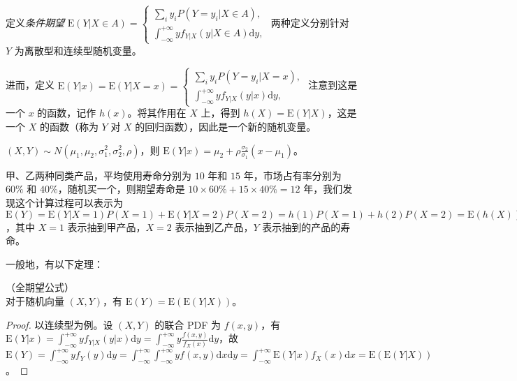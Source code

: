 \documentclass[../main.tex]{subfiles}
\begin{document}
定义\emph{条件期望} $\mathrm E(Y|X\in A)=\left\{
    \begin{aligned}
        \sum_iy_iP(Y=y_i|X\in A), \\
        \int_{-\infty}^{+\infty}yf_{Y|X}(y|X\in A)\mathrm dy,
    \end{aligned}\right.$ 两种定义分别针对 $Y$ 为离散型和连续型随机变量。

进而，定义 $\mathrm E(Y|x)=\mathrm E(Y|X=x)=\left\{
    \begin{aligned}
        \sum_iy_iP(Y=y_i|X=x), \\
        \int_{-\infty}^{+\infty}yf_{Y|X}(y|x)\mathrm dy,
    \end{aligned}\right.$ 注意到这是一个 $x$ 的函数，记作 $h(x)$。将其作用在 $X$ 上，得到 $h(X)=\mathrm E(Y|X)$，这是一个 $X$ 的函数（称为 $Y$ 对 $X$ 的回归函数），因此是一个新的随机变量。

\begin{example}
    $(X,Y)\sim N(\mu_1,\mu_2,\sigma_1^2,\sigma_2^2,\rho)$，则 $\mathrm E(Y|x)=\mu_2+\rho\frac{\sigma_2}{\sigma_1}(x-\mu_1)$。
\end{example}

\begin{example}
    甲、乙两种同类产品，平均使用寿命分别为 $10$ 年和 $15$ 年，市场占有率分别为 $60\%$ 和 $40\%$，随机买一个，则期望寿命是 $10\times 60\%+15\times 40\%=12$ 年，我们发现这个计算过程可以表示为 $\mathrm E(Y)=\mathrm E(Y|X=1)P(X=1)+\mathrm E(Y|X=2)P(X=2)=h(1)P(X=1)+h(2)P(X=2)=\mathrm E(h(X))=\mathrm E(\mathrm E(Y|X))$，其中 $X=1$ 表示抽到甲产品，$X=2$ 表示抽到乙产品，$Y$ 表示抽到的产品的寿命。
\end{example}

一般地，有以下定理：

\begin{theorem}\label{thm:4.7.1}
    （全期望公式）\\
    对于随机向量 $(X,Y)$，有 $\mathrm E(Y)=\mathrm E(\mathrm E(Y|X))$。
\end{theorem}

\begin{proof}
    以连续型为例。设 $(X,Y)$ 的联合 PDF 为 $f(x,y)$，有 $\mathrm E(Y|x)=\int_{-\infty}^{+\infty}yf_{Y|X}(y|x)\mathrm dy=\int_{-\infty}^{+\infty}y\frac{f(x,y)}{f_X(x)}\mathrm dy$，故 $\mathrm E(Y)=\int_{-\infty}^{+\infty}yf_Y(y)\mathrm dy=\int_{-\infty}^{+\infty}\int_{-\infty}^{+\infty}yf(x,y)\mathrm dx\mathrm dy=\int_{-\infty}^{+\infty}\mathrm E(Y|x)f_X(x)\mathrm dx=\mathrm E(\mathrm E(Y|X))$。
\end{proof}
\end{document}
